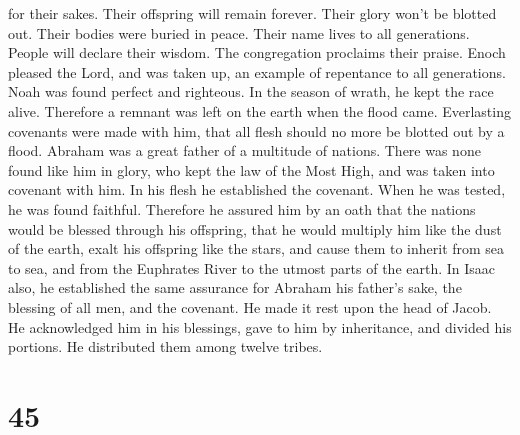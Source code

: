 for their sakes.  Their offspring will remain forever.
Their glory won't be blotted out.  Their bodies were buried
in peace. Their name lives to all generations.  People will
declare their wisdom. The congregation proclaims their praise.
 Enoch pleased the Lord, and was taken up, an example of
repentance to all generations.  Noah was found perfect and
righteous. In the season of wrath, he kept the race alive. Therefore a
remnant was left on the earth when the flood came. 
Everlasting covenants were made with him, that all flesh should no more
be blotted out by a flood.  Abraham was a great father of a
multitude of nations. There was none found like him in glory,
 who kept the law of the Most High, and was taken into
covenant with him. In his flesh he established the covenant. When he was
tested, he was found faithful.  Therefore he assured him by
an oath that the nations would be blessed through his offspring, that he
would multiply him like the dust of the earth, exalt his offspring like
the stars, and cause them to inherit from sea to sea, and from the
Euphrates River to the utmost parts of the earth.  In Isaac
also, he established the same assurance for Abraham his father's sake,
the blessing of all men, and the covenant.  He made it rest
upon the head of Jacob. He acknowledged him in his blessings, gave to
him by inheritance, and divided his portions. He distributed them among
twelve tribes.

\hypertarget{section-12}{%
\section{45}\label{section-12}}

